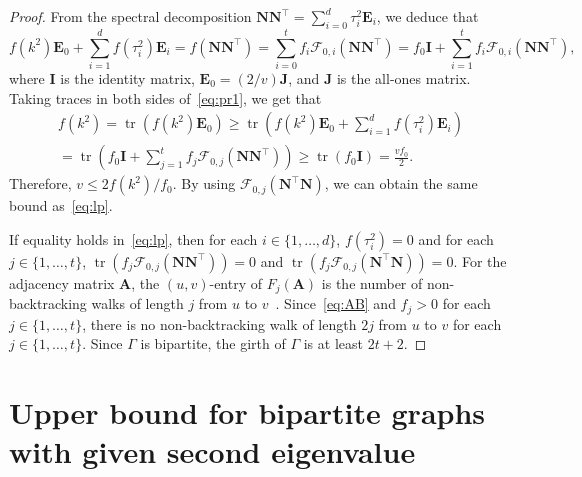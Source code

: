 \documentclass[10pt]{amsart}
\DeclareMathOperator{\tr}{tr}
\begin{document}
\begin{proof}
From the spectral decomposition $\boldsymbol{N}\boldsymbol{N}^{\top}= 
\sum_{i=0}^d \tau_i^2 \boldsymbol{E}_i$, we deduce that 
\begin{equation} \label{eq:pr1}
f(k^2) \boldsymbol{E}_0+ \sum_{i=1}^d f(\tau_i^2) \boldsymbol{E}_i
=f(\boldsymbol{N}\boldsymbol{N}^{\top})=\sum_{i= 0}^t f_i \mathscr{F}_{0,i}(\boldsymbol{N}\boldsymbol{N}^{\top})=
f_0 \boldsymbol{I} + \sum_{i= 1}^t f_i \mathscr{F}_{0,i}(\boldsymbol{N}\boldsymbol{N}^{\top}), 
\end{equation}
where $\boldsymbol{I}$ is the identity matrix, $\boldsymbol{E}_0=(2/v)\boldsymbol{J}$, and $\boldsymbol{J}$ is the all-ones matrix. 
Taking traces in both sides of~\eqref{eq:pr1}, we get that
\begin{multline*}
 f(k^2)=\tr ( f(k^2) \boldsymbol{E}_0 )
\geq \tr \left( f(k^2) \boldsymbol{E}_0+ \sum_{i=1}^d f(\tau_i^2) \boldsymbol{E}_i\right) \\
= 
\tr \left( f_0 \boldsymbol{I} + \sum_{j= 1}^t f_j\mathscr{F}_{0,j}(\boldsymbol{N}\boldsymbol{N}^{\top}) \right) 
\geq \tr ( f_0 \boldsymbol{I})
=\frac{v f_0}{2}. 
\end{multline*}
Therefore, $v\leq 2 f(k^2)/f_0$. 
By using $\mathscr{F}_{0,j}(\boldsymbol{N}^{\top} \boldsymbol{N})$, 
we can obtain the same bound as~\eqref{eq:lp}. 

If equality holds in~\eqref{eq:lp}, then for each $i \in \{1,\ldots, d\}$, $f(\tau_i^2)=0$ and for each $j\in \{1,\dots,t\}$, $\tr (f_j\mathscr{F}_{0,j}(\boldsymbol{N}\boldsymbol{N}^{\top}))=0$ and $\tr (f_j\mathscr{F}_{0,j}(\boldsymbol{N}^{\top} \boldsymbol{N}))=0$. 
 For the adjacency matrix $\boldsymbol{A}$, the $(u,v)$-entry of $F_{j}(\boldsymbol{A})$ is the number of non-backtracking walks of length $j$ from $u$ to $v$~\cite{S66}. 
Since~\eqref{eq:AB} and $f_j>0$ for each $j \in \{1,\ldots, t\}$, there is no non-backtracking walk of length $2j$ from $u$ to $v$ for each $j \in \{1,\ldots, t\}$. Since $\Gamma$ is bipartite, the girth of $\Gamma$ is at least $2t+2$. 
\end{proof}


\section{Upper bound for bipartite graphs with given second eigenvalue}
\label{sec:newbound}
\end{document}
